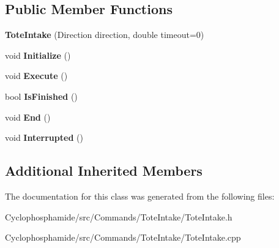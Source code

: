 \subsection*{Public Member Functions}
\begin{DoxyCompactItemize}
\item 
\hypertarget{class_tote_intake_a565c337f390efe99e6d4cd5b9aaa4f65}{}{\bfseries Tote\+Intake} (Direction direction, double timeout=0)\label{class_tote_intake_a565c337f390efe99e6d4cd5b9aaa4f65}

\item 
\hypertarget{class_tote_intake_a827598afdc7b43772bce4964e86388b3}{}void {\bfseries Initialize} ()\label{class_tote_intake_a827598afdc7b43772bce4964e86388b3}

\item 
\hypertarget{class_tote_intake_a034514f1dc307f9e7d609403496931b0}{}void {\bfseries Execute} ()\label{class_tote_intake_a034514f1dc307f9e7d609403496931b0}

\item 
\hypertarget{class_tote_intake_af56496899456386ddd5a1396ceaa44e2}{}bool {\bfseries Is\+Finished} ()\label{class_tote_intake_af56496899456386ddd5a1396ceaa44e2}

\item 
\hypertarget{class_tote_intake_a1e801691281940bcc410dfcd1a3f13ac}{}void {\bfseries End} ()\label{class_tote_intake_a1e801691281940bcc410dfcd1a3f13ac}

\item 
\hypertarget{class_tote_intake_a08d4690348e422e6dfedcff4758edaf7}{}void {\bfseries Interrupted} ()\label{class_tote_intake_a08d4690348e422e6dfedcff4758edaf7}

\end{DoxyCompactItemize}
\subsection*{Additional Inherited Members}


The documentation for this class was generated from the following files\+:\begin{DoxyCompactItemize}
\item 
Cyclophosphamide/src/\+Commands/\+Tote\+Intake/Tote\+Intake.\+h\item 
Cyclophosphamide/src/\+Commands/\+Tote\+Intake/Tote\+Intake.\+cpp\end{DoxyCompactItemize}
